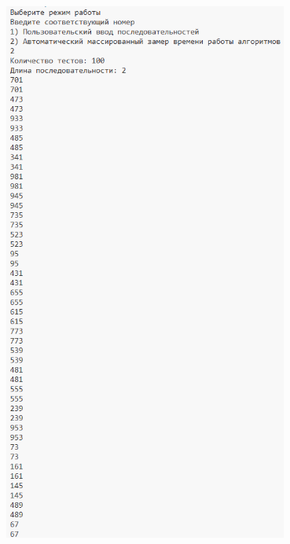 \documentclass[14pt]{article}
\begin{document}
	\begin{center}
		\includegraphics[width = 0.7\textwidth]{example_4.png}
		\label{fig:4}
	\end{center}
\end{document}

